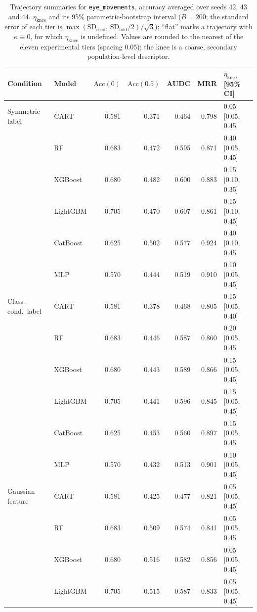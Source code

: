 \begin{table}[p]
\centering
\scriptsize
\setlength{\tabcolsep}{3.5pt}
\caption{Trajectory summaries for \texttt{eye\_movements}, accuracy averaged over seeds 42, 43 and 44. $\eta_{\mathrm{knee}}$ and its 95\% parametric-bootstrap interval ($B=200$; the standard error of each tier is $\max(\mathrm{SD}_{\mathrm{seed}},\,\mathrm{SD}_{\mathrm{fold}}/2)/\sqrt3$); ``flat'' marks a trajectory with $\kappa\equiv 0$, for which $\eta_{\mathrm{knee}}$ is undefined. Values are rounded to the nearest of the eleven experimental tiers (spacing $0.05$); the knee is a coarse, secondary population-level descriptor.}
\label{tab:traj_eye_movements}
\begin{tabular}{@{}llrrrrl@{}}
\toprule
Condition & Model & $\mathrm{Acc}(0)$ & $\mathrm{Acc}(0.5)$ & AUDC & MRR & $\eta_{\mathrm{knee}}$ [95\% CI] \\
\midrule
Symmetric label & CART & 0.581 & 0.371 & 0.464 & 0.798 & 0.05 [0.05, 0.45] \\
 & RF & 0.683 & 0.472 & 0.595 & 0.871 & 0.40 [0.05, 0.45] \\
 & XGBoost & 0.680 & 0.482 & 0.600 & 0.883 & 0.15 [0.10, 0.35] \\
 & LightGBM & 0.705 & 0.470 & 0.607 & 0.861 & 0.15 [0.10, 0.45] \\
 & CatBoost & 0.625 & 0.502 & 0.577 & 0.924 & 0.40 [0.10, 0.45] \\
 & MLP & 0.570 & 0.444 & 0.519 & 0.910 & 0.10 [0.05, 0.45] \\
\midrule
Class-cond.\ label & CART & 0.581 & 0.378 & 0.468 & 0.805 & 0.15 [0.05, 0.40] \\
 & RF & 0.683 & 0.446 & 0.587 & 0.860 & 0.20 [0.05, 0.45] \\
 & XGBoost & 0.680 & 0.443 & 0.589 & 0.866 & 0.15 [0.05, 0.45] \\
 & LightGBM & 0.705 & 0.441 & 0.596 & 0.845 & 0.15 [0.05, 0.45] \\
 & CatBoost & 0.625 & 0.453 & 0.560 & 0.897 & 0.15 [0.05, 0.45] \\
 & MLP & 0.570 & 0.432 & 0.513 & 0.901 & 0.10 [0.05, 0.45] \\
\midrule
Gaussian feature & CART & 0.581 & 0.425 & 0.477 & 0.821 & 0.05 [0.05, 0.45] \\
 & RF & 0.683 & 0.509 & 0.574 & 0.841 & 0.05 [0.05, 0.45] \\
 & XGBoost & 0.680 & 0.516 & 0.582 & 0.856 & 0.05 [0.05, 0.45] \\
 & LightGBM & 0.705 & 0.515 & 0.587 & 0.833 & 0.05 [0.05, 0.45] \\

\end{tabular}
\end{table}
